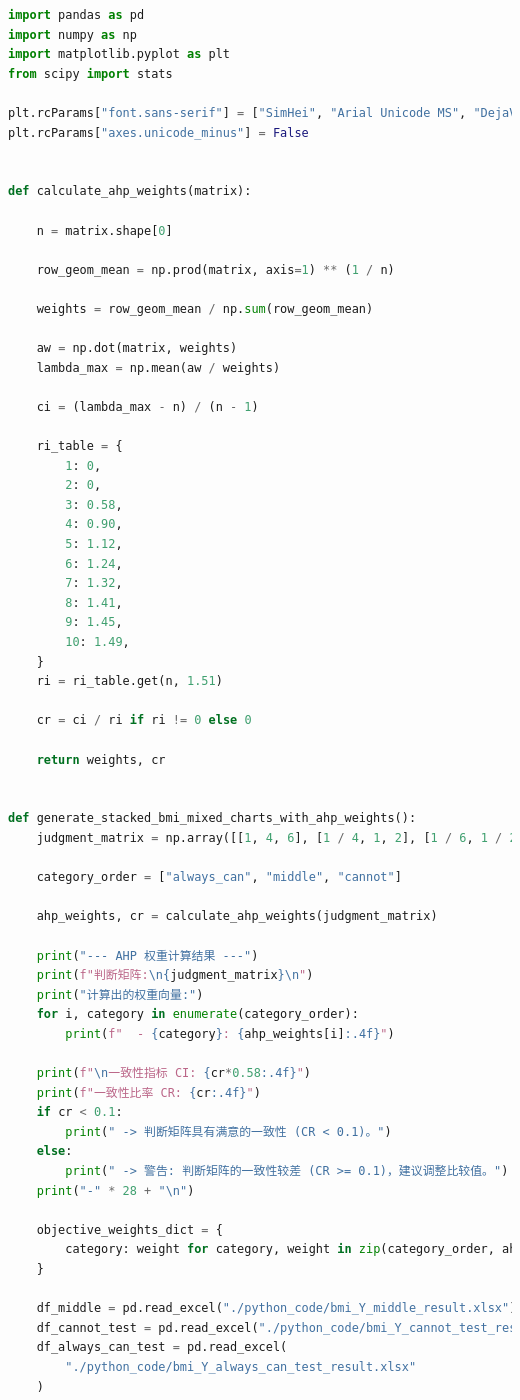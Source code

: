 \documentclass{article}
\begin{document}
\begin{lstlisting}[language=Python, caption={C(2)(权重计算).py}, label={code:python_example}]
import pandas as pd
import numpy as np
import matplotlib.pyplot as plt
from scipy import stats

plt.rcParams["font.sans-serif"] = ["SimHei", "Arial Unicode MS", "DejaVu Sans"]
plt.rcParams["axes.unicode_minus"] = False


def calculate_ahp_weights(matrix):

    n = matrix.shape[0]

    row_geom_mean = np.prod(matrix, axis=1) ** (1 / n)

    weights = row_geom_mean / np.sum(row_geom_mean)

    aw = np.dot(matrix, weights)
    lambda_max = np.mean(aw / weights)

    ci = (lambda_max - n) / (n - 1)

    ri_table = {
        1: 0,
        2: 0,
        3: 0.58,
        4: 0.90,
        5: 1.12,
        6: 1.24,
        7: 1.32,
        8: 1.41,
        9: 1.45,
        10: 1.49,
    }
    ri = ri_table.get(n, 1.51)

    cr = ci / ri if ri != 0 else 0

    return weights, cr


def generate_stacked_bmi_mixed_charts_with_ahp_weights():
    judgment_matrix = np.array([[1, 4, 6], [1 / 4, 1, 2], [1 / 6, 1 / 2, 1]])

    category_order = ["always_can", "middle", "cannot"]

    ahp_weights, cr = calculate_ahp_weights(judgment_matrix)

    print("--- AHP 权重计算结果 ---")
    print(f"判断矩阵:\n{judgment_matrix}\n")
    print("计算出的权重向量:")
    for i, category in enumerate(category_order):
        print(f"  - {category}: {ahp_weights[i]:.4f}")

    print(f"\n一致性指标 CI: {cr*0.58:.4f}")
    print(f"一致性比率 CR: {cr:.4f}")
    if cr < 0.1:
        print(" -> 判断矩阵具有满意的一致性 (CR < 0.1)。")
    else:
        print(" -> 警告: 判断矩阵的一致性较差 (CR >= 0.1)，建议调整比较值。")
    print("-" * 28 + "\n")

    objective_weights_dict = {
        category: weight for category, weight in zip(category_order, ahp_weights)
    }

    df_middle = pd.read_excel("./python_code/bmi_Y_middle_result.xlsx")
    df_cannot_test = pd.read_excel("./python_code/bmi_Y_cannot_test_result.xlsx")
    df_always_can_test = pd.read_excel(
        "./python_code/bmi_Y_always_can_test_result.xlsx"
    )


\end{lstlisting}
\end{document}
